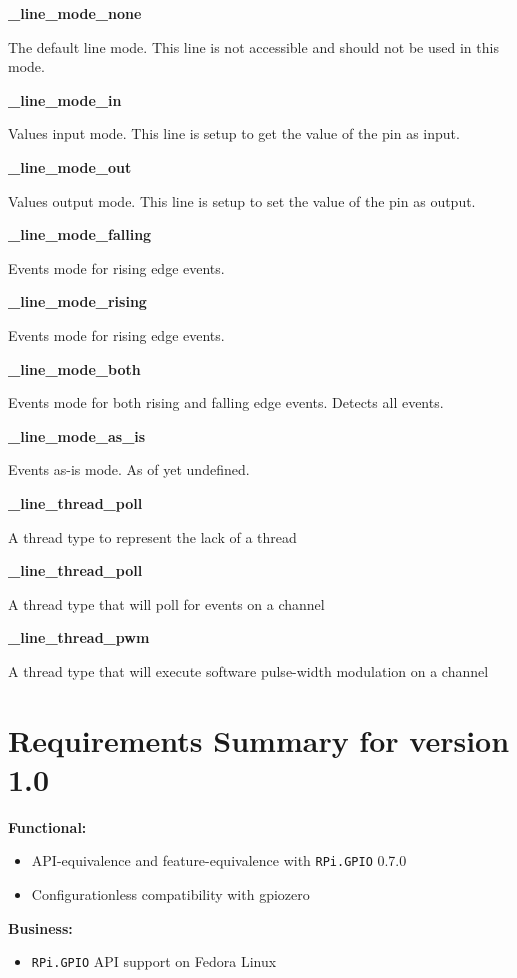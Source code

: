 \documentclass[12pt]{article}
\begin{document}
\noindent \textbf{\_line\_mode\_none}

The default line mode. This line is not accessible and should not be used in this mode.

\noindent \textbf{\_line\_mode\_in}

Values input mode. This line is setup to get the value of the pin as input.

\noindent \textbf{\_line\_mode\_out}

Values output mode. This line is setup to set the value of the pin as output.

\noindent \textbf{\_line\_mode\_falling}

Events mode for rising edge events.

\noindent \textbf{\_line\_mode\_rising}

Events mode for rising edge events.

\noindent \textbf{\_line\_mode\_both}

Events mode for both rising and falling edge events. Detects all events.

\noindent \textbf{\_line\_mode\_as\_is}

Events as-is mode. As of yet undefined.

\noindent \textbf{\_line\_thread\_poll}

A thread type to represent the lack of a thread

\noindent \textbf{\_line\_thread\_poll}

A thread type that will poll for events on a channel

\noindent \textbf{\_line\_thread\_pwm}

A thread type that will execute software pulse-width modulation on a channel

\section{Requirements Summary for version 1.0}

\noindent \textbf{Functional:}
\begin{itemize}
    \item API-equivalence and feature-equivalence with \texttt{RPi.GPIO} 0.7.0 \cite{rpigpio}
    \item Configurationless compatibility with gpiozero \cite{gpiozero}
\end{itemize}

\noindent \textbf{Business:}
\begin{itemize}
    \item \texttt{RPi.GPIO} API support on Fedora Linux
\end{itemize}




\end{document}
